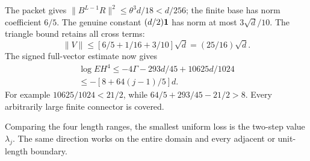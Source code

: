 The packet gives \(\|B^{L-1}R\|^2\le\theta^3d/18<d/256\); the finite base has norm coefficient \(6/5\). The genuine constant \((d/2)\mathbf1\) has norm at most \(3\sqrt d/10\). The triangle bound retains all cross terms:
\[
 \|V\|\le[6/5+1/16+3/10]\sqrt d=(25/16)\sqrt d.
\]
The signed full-vector estimate now gives
\[
\begin{gathered}
\log EH^4\le-4\Gamma-293d/45+10625d/1024\\
\le-[8+64(j-1)/5]d.
\end{gathered}\tag{C180.34}
\]
For example \(10625/1024<21/2\), while \(64/5+293/45-21/2>8\). Every arbitrarily large finite connector is covered.

Comparing the four length ranges, the smallest uniform loss is the two-step value \(\lambda_j\). The same direction works on the entire domain and every adjacent or unit-length boundary.
